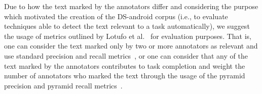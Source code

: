 Due to how the text marked by the annotators differ
and considering the purpose which motivated the creation of the \acs{DS-android} corpus
(i.e., to evaluate techniques able to detect the text relevant to a task automatically),
we suggest the usage of metrics outlined by Lotufo et al.~\cite{Lotufo2012} for evaluation purposes. 
That is,
one can consider the text marked only by two or more annotators as relevant
and use standard precision and recall metrics~\cite{Manning2009IR}, or one can consider that
any of the text marked by the annotators 
contributes to task completion and weight the number of 
annotators who marked the text through the usage of the pyramid 
precision and pyramid recall metrics~\cite{Nenkova2004, Lotufo2012}. 
 







